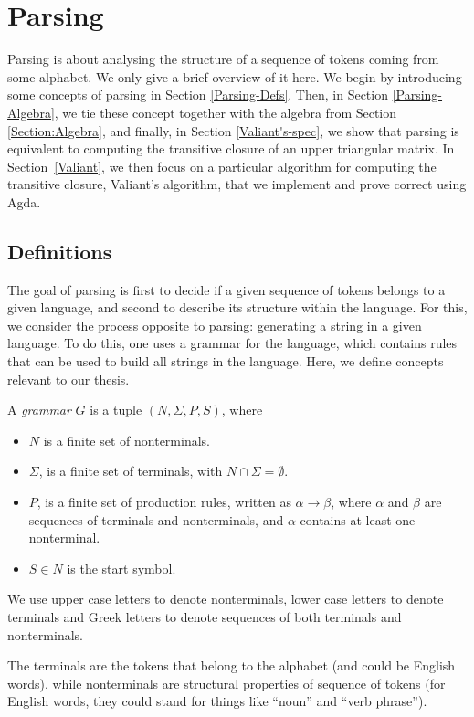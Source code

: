 \newcommand{\productions}{P}
\newcommand{\nonterminals}{N}
\newcommand{\terminals}{\Sigma}
\newcommand{\startsymbol}{S}
\newcommand{\grammar}{(\nonterminals, \terminals, \productions, \startsymbol)}
\chapter{Parsing}
\label{Parsing}
Parsing is about analysing the structure of a sequence of tokens coming from some alphabet. We only give a brief overview of it here.
We begin by introducing some concepts of parsing in Section \ref{Parsing-Defs}. Then, in Section \ref{Parsing-Algebra}, we tie these concept together with the algebra from Section \ref{Section:Algebra}, and finally, in Section \ref{Valiant's-spec}, we show that parsing is equivalent to computing the transitive closure of an upper triangular matrix.
In Section~\ref{Valiant}, we then focus on a particular algorithm for computing the transitive closure, Valiant's algorithm, that we implement and prove correct using Agda.

\section{Definitions}
The goal of parsing is first to decide if a given sequence of tokens belongs to a given language, and second to describe its structure within the language.
For this, we consider the process opposite to parsing: generating a string in a given language. To do this, one uses a grammar for the language, which contains rules that can be used to build all strings in the language.
\label{Parsing-Defs}
Here, we define concepts relevant to our thesis.
\begin{Definition}
  A \emph{grammar} $G$ is a tuple $\grammar$, where 
  \begin{itemize}
  \item $\nonterminals$ is a finite set of nonterminals.
  \item $\terminals$, is a finite set of terminals, with $\nonterminals \cap \terminals = \emptyset$.
  \item $\productions$, is a finite set of production rules, written as $\alpha \to \beta$, where $\alpha$ and $\beta$ are sequences of terminals and nonterminals, and $\alpha$ contains at least one nonterminal.
  \item $\startsymbol \in \nonterminals$ is the start symbol.
  \end{itemize}
  We use upper case letters to denote nonterminals, lower case letters to denote terminals and Greek letters to denote sequences of both terminals and nonterminals.
\end{Definition}
The terminals are the tokens that belong to the alphabet (and could be English words), while nonterminals are structural properties of sequence of tokens (for English words, they could stand for things like ``noun'' and ``verb phrase'').

